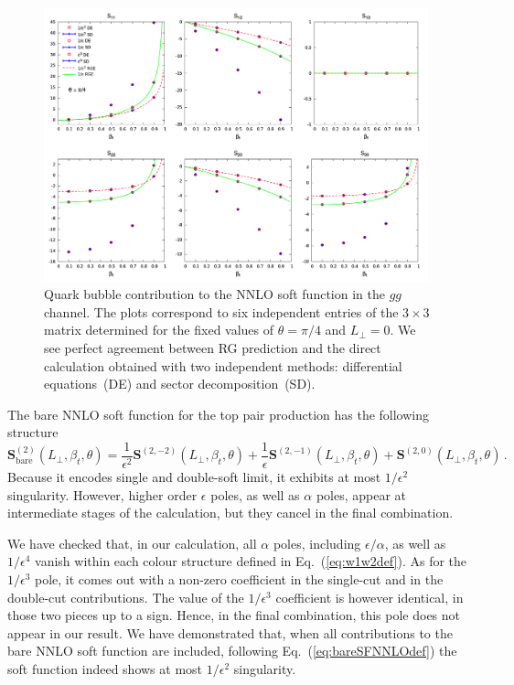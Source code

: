 \documentclass[a4paper,11pt]{article}
\newcommand{\bfS}{\bm{S}}
\newcommand{\LT}{L_\perp}
\numberwithin{equation}{section}
\begin{document}
\begin{figure}[!h]
  \begin{center}
    \includegraphics[width=0.99\textwidth]{plots/soft-function-gg-qbub-beta.png}
  \end{center}
  \caption{
  Quark bubble contribution to the NNLO soft function in the $gg$ channel.
  The plots correspond to six independent entries of the $3\times 3$ matrix
  determined for the fixed values of $\theta = \pi/4$ and $\LT = 0$.
  We see perfect agreement between RG prediction and the direct calculation
  obtained with two independent methods: differential equations~(DE) and sector
  decomposition~(SD).
  }
  \label{fig:quarkbubblegg}
\end{figure}


The bare NNLO soft function for the top pair production has the following
structure
%
\begin{equation}
  \bfS^{(2)}_\text{bare}(\LT, \beta_t,\theta) =
  \frac{1}{\epsilon^2} \bfS^{(2,-2)}(\LT, \beta_t,\theta) +
  \frac{1}{\epsilon} \bfS^{(2,-1)}(\LT, \beta_t,\theta)
  + \bfS^{(2,0)}(\LT, \beta_t,\theta)\,.
  \label{eq:bareSFNNLOpoles}
\end{equation}
%
Because it encodes single and double-soft limit, it exhibits at most
$1/\epsilon^2$ singularity. However, higher order $\epsilon$ poles, as well as
$\alpha$ poles, appear at intermediate stages of the calculation, but they
cancel in the final combination.

We have checked that, in our calculation, all $\alpha$ poles, including
$\epsilon/\alpha$, as well as $1/\epsilon^4$ vanish within each colour structure
defined in Eq.~(\ref{eq:w1w2def}). As for the $1/\epsilon^3$ pole, it comes out
with a non-zero coefficient in the single-cut and in the double-cut
contributions. The value of the $1/\epsilon^3$ coefficient is however identical,
in those two pieces up to a sign. Hence, in the final combination, this pole
does not appear in our result.
%
We have demonstrated that, when all contributions to the bare NNLO soft
function are included, following Eq.~(\ref{eq:bareSFNNLOdef}) the soft function
indeed shows at most $1/\epsilon^2$ singularity.
\end{document}
